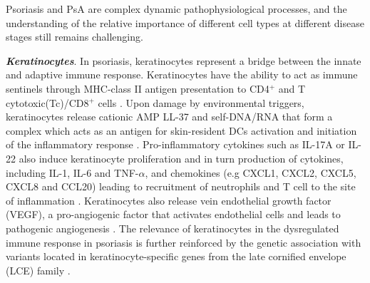 Psoriasis and PsA are complex dynamic pathophysiological processes, and the understanding of the relative importance of different cell types at different disease stages still remains challenging.


\textbf{\textit{Keratinocytes}}. In psoriasis, keratinocytes represent a bridge between the innate and adaptive immune response. Keratinocytes have the ability to act as immune sentinels through MHC-class II antigen presentation to CD4$^+$ and T cytotoxic(Tc)/CD8$^+$ cells \parencite{Black2007}. Upon damage by environmental triggers, keratinocytes release cationic AMP LL-37 and self-DNA/RNA that form a complex which acts as an antigen for skin-resident DCs activation and initiation of the inflammatory response \parencite{Lande2007}. Pro-inflammatory cytokines such as IL-17A or IL-22 also induce keratinocyte proliferation and in turn production of cytokines, including IL-1, IL-6 and TNF-$\alpha$, and chemokines (e.g CXCL1, CXCL2, CXCL5, CXCL8 and CCL20) leading to recruitment of neutrophils and T cell to the site of inflammation \parencite{Feldmeyer2007, Arend2008, Nestle2009, Nestle2005}. Keratinocytes also release vein endothelial growth factor (VEGF), a pro-angiogenic factor that activates endothelial cells and leads to pathogenic angiogenesis \parencite{Xia2003}. The relevance of keratinocytes in the dysregulated immune response in psoriasis is further reinforced by the genetic association with variants located in keratinocyte-specific genes from the late cornified envelope (LCE) family \parencite{Tsoi2012}. 


